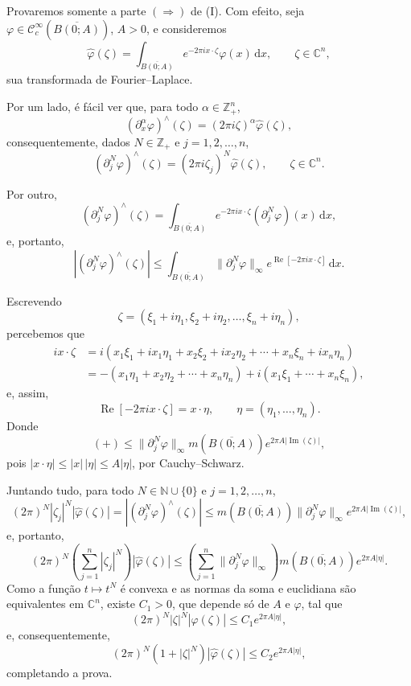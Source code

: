 \documentclass[../distribution_theory_notes.tex]{subfiles}
\begin{document}
\begin{proof*}
	Provaremos somente a parte \((\Rightarrow)\) de (I). Com efeito, seja \(\varphi\in\mathcal{C}_c^\infty(\overline{B(0;A)})\), \(A>0\), e consideremos
	\[
		\hat\varphi(\zeta)
		=\int_{\overline{B(0;A)}}e^{-2\pi i x\cdot\zeta}\varphi(x)\,\mathrm{d}x,
		\qquad \zeta\in\mathbb{C}^n,
	\]
	sua transformada de Fourier--Laplace.

	Por um lado, é fácil ver que, para todo \(\alpha\in\mathbb{Z}_+^n\),
	\[
		(\partial_x^\alpha\varphi)^\wedge(\zeta)
		=(2\pi i\zeta)^\alpha\hat\varphi(\zeta),
	\]
	consequentemente, dados \(N\in\mathbb{Z}_+\) e \(j=1,2,\ldots,n\),
	\[
		(\partial_j^N\varphi)^\wedge(\zeta)
		=(2\pi i\zeta_j)^N\hat\varphi(\zeta),
		\qquad \zeta\in\mathbb{C}^n.
	\]

	Por outro,
	\[
		(\partial_j^N\varphi)^\wedge(\zeta)
		=\int_{\overline{B(0;A)}}e^{-2\pi i x\cdot\zeta}(\partial_j^N\varphi)(x)\,\mathrm{d}x,
	\]
	e, portanto,
	\[
		\left|(\partial_j^N\varphi)^\wedge(\zeta)\right|
		\leq\int_{\overline{B(0;A)}}
		\|\partial_j^N\varphi\|_\infty
		e^{\operatorname{Re}[-2\pi i x\cdot\zeta]}
		\,\mathrm{d}x.\tag{+}
	\]

	Escrevendo
	\[
		\zeta=(\xi_1+i\eta_1,\xi_2+i\eta_2,\ldots,\xi_n+i\eta_n),
	\]
	percebemos que
	\begin{align*}
		i x\cdot\zeta
		 & =i(x_1\xi_1+i x_1\eta_1+x_2\xi_2+i x_2\eta_2+\cdots+x_n\xi_n+i x_n\eta_n) \\
		 & =-(x_1\eta_1+x_2\eta_2+\cdots+x_n\eta_n)
		+i(x_1\xi_1+\cdots+x_n\xi_n),
	\end{align*}
	e, assim,
	\[
		\operatorname{Re}[-2\pi i x\cdot\zeta]=x\cdot\eta,
		\qquad \eta=(\eta_1,\ldots,\eta_n).
	\]
	Donde
	\[
		(+)\leq \|\partial_j^N\varphi\|_\infty
		m(\overline{B(0;A)})e^{2\pi A|\operatorname{Im}(\zeta)|},
	\]
	pois \(|x\cdot\eta|\leq|x|\,|\eta|\leq A|\eta|\), por Cauchy--Schwarz.

	Juntando tudo, para todo \(N\in\mathbb{N}\cup\{0\}\) e \(j=1,2,\ldots,n\),
	\[
		(2\pi)^N|\zeta_j|^N|\hat\varphi(\zeta)|
		=|(\partial_j^N\varphi)^\wedge(\zeta)|
		\leq m(\overline{B(0;A)})\|\partial_j^N\varphi\|_\infty
		e^{2\pi A|\operatorname{Im}(\zeta)|},
	\]
	e, portanto,
	\[
		(2\pi)^N\left(\sum_{j=1}^n|\zeta_j|^N\right)|\hat\varphi(\zeta)|
		\leq\left(\sum_{j=1}^n\|\partial_j^N\varphi\|_\infty\right)
		m(\overline{B(0;A)})e^{2\pi A|\eta|}.
	\]
	Como a função \(t\mapsto t^N\) é convexa e as normas da soma e euclidiana são equivalentes em \(\mathbb{C}^n\), existe \(C_1>0\), que depende só de \(A\) e \(\varphi\), tal que
	\[
		(2\pi)^N|\zeta|^N|\hat\varphi(\zeta)|
		\leq C_1e^{2\pi A|\eta|},
	\]
	e, consequentemente,
	\[
		(2\pi)^N(1+|\zeta|^N)|\hat\varphi(\zeta)|
		\leq C_2e^{2\pi A|\eta|},
	\]
	completando a prova.


\end{proof*}
\end{document}
